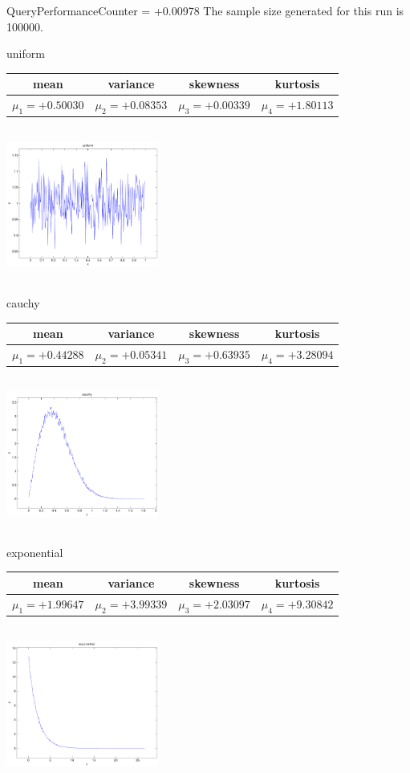 \documentclass[9pt]{article}
\theoremstyle{plain}
\theoremstyle{definition}
\theoremstyle{remark}
\numberwithin{equation}{section}
\begin{document}
QueryPerformanceCounter  =  +0.00978
The sample size generated for this run is 100000.

\newpage
uniform \begin{tabular}{|c|c|c|c|}  mean & variance & skewness & kurtosis \\  \hline
$\mu_1 = +0.50030$ & $\mu_2 = +0.08353$ & $\mu_3 = +0.00339$ & $\mu_4 =+1.80113$ \\
\end{tabular}

\includegraphics[width=5cm,height=5cm]{uniform.pdf}

cauchy \begin{tabular}{|c|c|c|c|}  mean & variance & skewness & kurtosis \\  \hline
$\mu_1 = +0.44288$ & $\mu_2 = +0.05341$ & $\mu_3 = +0.63935$ & $\mu_4 =+3.28094$ \\
\end{tabular}

\includegraphics[width=5cm,height=5cm]{cauchy.pdf}

exponential \begin{tabular}{|c|c|c|c|}  mean & variance & skewness & kurtosis \\  \hline
$\mu_1 = +1.99647$ & $\mu_2 = +3.99339$ & $\mu_3 = +2.03097$ & $\mu_4 =+9.30842$ \\
\end{tabular}

\includegraphics[width=5cm,height=5cm]{exponential.pdf}
\end{document}
